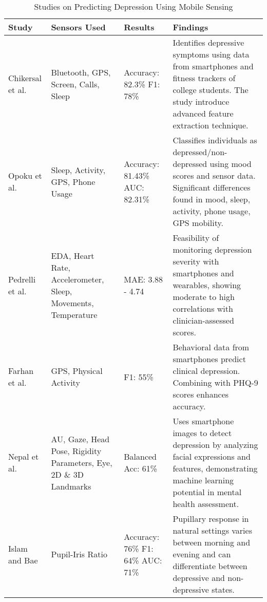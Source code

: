 \begin{table}[h]
\caption{\label{tab:background2}Studies on Predicting Depression Using Mobile Sensing}
\centering
\tiny

\begin{tabular}{p{2cm}p{3cm}p{2cm}p{5.5cm}}
\toprule
\textbf{Study} & \textbf{Sensors Used} & \textbf{Results} & \textbf{Findings} \\
\midrule

Chikersal et al. \cite{chikersal2021detecting} & Bluetooth, GPS, Screen, Calls, Sleep & Accuracy: 82.3\% \newline F1: 78\% & Identifies depressive symptoms using data from smartphones and fitness trackers of college students. The study introduce advanced feature extraction technique. \\

Opoku et al. \cite{opoku2022mood} & Sleep, Activity, GPS, Phone Usage & Accuracy: 81.43\% \newline AUC: 82.31\% & Classifies individuals as depressed/non-depressed using mood scores and sensor data. Significant differences found in mood, sleep, activity, phone usage, GPS mobility. \\

Pedrelli et al. \cite{pedrelli2020monitoring} & EDA, Heart Rate, Accelerometer, Sleep, Movements, Temperature & MAE: 3.88 - 4.74  & Feasibility of monitoring depression severity with smartphones and wearables, showing moderate to high correlations with clinician-assessed scores. \\

Farhan et al. \cite{farhan2016behavior} & GPS, Physical Activity & F1: 55\% & Behavioral data from smartphones predict clinical depression. Combining with PHQ-9 scores enhances accuracy. \\

Nepal et al. \cite{nepal2024moodcapture} & AU, Gaze, Head Pose, Rigidity Parameters, Eye, 2D \& 3D Landmarks & Balanced Acc: 61\% & Uses smartphone images to detect depression by analyzing facial expressions and features, demonstrating machine learning potential in mental health assessment. \\

Islam and Bae \cite{islam2024pupilsense} & Pupil-Iris Ratio & Accuracy: 76\% \newline F1: 64\% \newline AUC: 71\% & Pupillary response in natural settings varies between morning and evening and can differentiate between depressive and non-depressive states. \\


\end{tabular}
\end{table}
